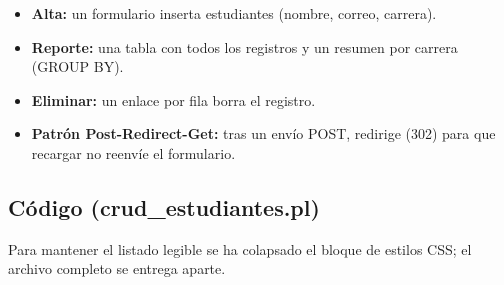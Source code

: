 \documentclass[11pt]{article}
\begin{document}
\begin{itemize}[leftmargin=1.4em,itemsep=2pt,topsep=2pt]
\item \textbf{Alta:} un formulario inserta estudiantes (nombre, correo, carrera).
\item \textbf{Reporte:} una tabla con todos los registros y un resumen por carrera (GROUP BY).
\item \textbf{Eliminar:} un enlace por fila borra el registro.
\item \textbf{Patrón Post-Redirect-Get:} tras un envío POST, redirige (302) para que recargar no reenvíe el formulario.
\end{itemize}
\subsection{Código (crud\_estudiantes.pl)}
Para mantener el listado legible se ha colapsado el bloque de estilos CSS; el archivo completo se entrega aparte.
\end{document}
